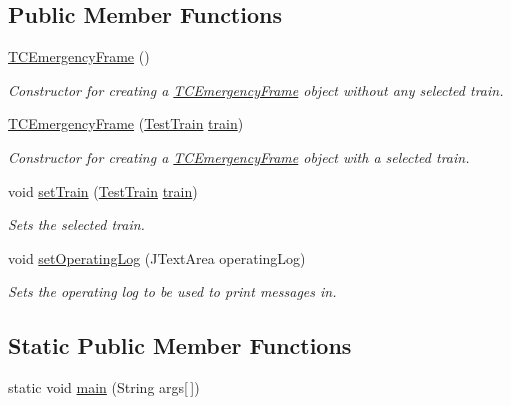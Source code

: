 \subsection*{Public Member Functions}
\begin{DoxyCompactItemize}
\item 
\hyperlink{classTrainControllerComps_1_1TCEmergencyFrame_a318efda39f1845bdcc8beacab2f15f02}{T\+C\+Emergency\+Frame} ()
\begin{DoxyCompactList}\small\item\em Constructor for creating a \hyperlink{classTrainControllerComps_1_1TCEmergencyFrame}{T\+C\+Emergency\+Frame} object without any selected train. \end{DoxyCompactList}\item 
\hyperlink{classTrainControllerComps_1_1TCEmergencyFrame_a389f462d159a3b37df539384297e4aca}{T\+C\+Emergency\+Frame} (\hyperlink{classTrainControllerComps_1_1TestTrain}{Test\+Train} \hyperlink{classtrain}{train})
\begin{DoxyCompactList}\small\item\em Constructor for creating a \hyperlink{classTrainControllerComps_1_1TCEmergencyFrame}{T\+C\+Emergency\+Frame} object with a selected train. \end{DoxyCompactList}\item 
void \hyperlink{classTrainControllerComps_1_1TCEmergencyFrame_a61d8cb274f6be974634700dd6eee045c}{set\+Train} (\hyperlink{classTrainControllerComps_1_1TestTrain}{Test\+Train} \hyperlink{classtrain}{train})
\begin{DoxyCompactList}\small\item\em Sets the selected train. \end{DoxyCompactList}\item 
void \hyperlink{classTrainControllerComps_1_1TCEmergencyFrame_a976ebb5248e43db7b076148f1d1e8f0b}{set\+Operating\+Log} (J\+Text\+Area operating\+Log)
\begin{DoxyCompactList}\small\item\em Sets the operating log to be used to print messages in. \end{DoxyCompactList}\end{DoxyCompactItemize}
\subsection*{Static Public Member Functions}
\begin{DoxyCompactItemize}
\item 
static void \hyperlink{classTrainControllerComps_1_1TCEmergencyFrame_a3a4826e73daed7e795104224492dfd78}{main} (String args\mbox{[}$\,$\mbox{]})
\end{DoxyCompactItemize}
